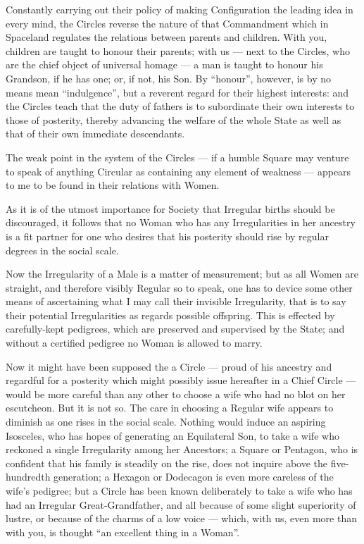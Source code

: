 \documentclass[12pt, a4paper, oneside]{memoir}
\begin{document}
Constantly carrying out their policy of making Configuration the leading idea
in every mind, the Circles reverse the nature of that Commandment which in
Spaceland regulates the relations between parents and children. With you,
children are taught to honour their parents; with us --- next to the Circles,
who are the chief object of universal homage --- a man is taught to honour his
Grandson, if he has one; or, if not, his Son. By ``honour'', however, is by no
means mean ``indulgence'', but a reverent regard for their highest interests:
and the Circles teach that the duty of fathers is to subordinate their own
interests to those of posterity, thereby advancing the welfare of the whole
State as well as that of their own immediate descendants.

The weak point in the system of the Circles --- if a humble Square may venture
to speak of anything Circular as containing any element of weakness --- appears
to me to be found in their relations with Women.

As it is of the utmost importance for Society that Irregular births should be
discouraged, it follows that no Woman who has any Irregularities in her
ancestry is a fit partner for one who desires that his posterity should rise
by regular degrees in the social scale.

Now the Irregularity of a Male is a matter of measurement; but as all Women
are straight, and therefore visibly Regular so to speak, one has to device
some other means of ascertaining what I may call their invisible Irregularity,
that is to say their potential Irregularities as regards possible offspring.
This is effected by carefully-kept pedigrees, which are preserved and
supervised by the State; and without a certified pedigree no Woman is allowed
to marry.

Now it might have been supposed the a Circle --- proud of his ancestry and
regardful for a posterity which might possibly issue hereafter in a Chief
Circle --- would be more careful than any other to choose a wife who had no blot
on her escutcheon. But it is not so. The care in choosing a Regular wife
appears to diminish as one rises in the social scale. Nothing would induce an
aspiring Isosceles, who has hopes of generating an Equilateral Son, to take a
wife who reckoned a single Irregularity among her Ancestors; a Square or
Pentagon, who is confident that his family is steadily on the rise, does not
inquire above the five-hundredth generation; a Hexagon or Dodecagon is even
more careless of the wife's pedigree; but a Circle has been known deliberately
to take a wife who has had an Irregular Great-Grandfather, and all because of
some slight superiority of lustre, or because of the charms of a low voice ---
which, with us, even more than with you, is thought ``an excellent thing in a
Woman''.
\end{document}
